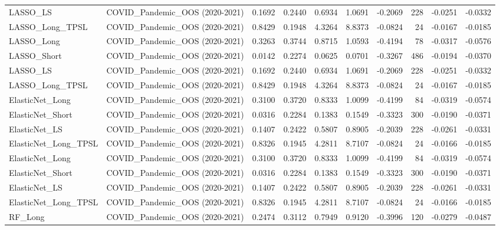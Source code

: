 \begin{tabular}{llrrrrrrrr}
\cline{1-10}
LASSO\_LS & COVID\_Pandemic\_OOS (2020-2021) & 0.1692 & 0.2440 & 0.6934 & 1.0691 & -0.2069 & 228 & -0.0251 & -0.0332 \\
\cline{1-10}
LASSO\_Long\_TPSL & COVID\_Pandemic\_OOS (2020-2021) & 0.8429 & 0.1948 & 4.3264 & 8.8373 & -0.0824 & 24 & -0.0167 & -0.0185 \\
\cline{1-10}
LASSO\_Long & COVID\_Pandemic\_OOS (2020-2021) & 0.3263 & 0.3744 & 0.8715 & 1.0593 & -0.4194 & 78 & -0.0317 & -0.0576 \\
\cline{1-10}
LASSO\_Short & COVID\_Pandemic\_OOS (2020-2021) & 0.0142 & 0.2274 & 0.0625 & 0.0701 & -0.3267 & 486 & -0.0194 & -0.0370 \\
\cline{1-10}
LASSO\_LS & COVID\_Pandemic\_OOS (2020-2021) & 0.1692 & 0.2440 & 0.6934 & 1.0691 & -0.2069 & 228 & -0.0251 & -0.0332 \\
\cline{1-10}
LASSO\_Long\_TPSL & COVID\_Pandemic\_OOS (2020-2021) & 0.8429 & 0.1948 & 4.3264 & 8.8373 & -0.0824 & 24 & -0.0167 & -0.0185 \\
\cline{1-10}
ElasticNet\_Long & COVID\_Pandemic\_OOS (2020-2021) & 0.3100 & 0.3720 & 0.8333 & 1.0099 & -0.4199 & 84 & -0.0319 & -0.0574 \\
\cline{1-10}
ElasticNet\_Short & COVID\_Pandemic\_OOS (2020-2021) & 0.0316 & 0.2284 & 0.1383 & 0.1549 & -0.3323 & 300 & -0.0190 & -0.0371 \\
\cline{1-10}
ElasticNet\_LS & COVID\_Pandemic\_OOS (2020-2021) & 0.1407 & 0.2422 & 0.5807 & 0.8905 & -0.2039 & 228 & -0.0261 & -0.0331 \\
\cline{1-10}
ElasticNet\_Long\_TPSL & COVID\_Pandemic\_OOS (2020-2021) & 0.8326 & 0.1945 & 4.2811 & 8.7107 & -0.0824 & 24 & -0.0166 & -0.0185 \\
\cline{1-10}
ElasticNet\_Long & COVID\_Pandemic\_OOS (2020-2021) & 0.3100 & 0.3720 & 0.8333 & 1.0099 & -0.4199 & 84 & -0.0319 & -0.0574 \\
\cline{1-10}
ElasticNet\_Short & COVID\_Pandemic\_OOS (2020-2021) & 0.0316 & 0.2284 & 0.1383 & 0.1549 & -0.3323 & 300 & -0.0190 & -0.0371 \\
\cline{1-10}
ElasticNet\_LS & COVID\_Pandemic\_OOS (2020-2021) & 0.1407 & 0.2422 & 0.5807 & 0.8905 & -0.2039 & 228 & -0.0261 & -0.0331 \\
\cline{1-10}
ElasticNet\_Long\_TPSL & COVID\_Pandemic\_OOS (2020-2021) & 0.8326 & 0.1945 & 4.2811 & 8.7107 & -0.0824 & 24 & -0.0166 & -0.0185 \\
\cline{1-10}
RF\_Long & COVID\_Pandemic\_OOS (2020-2021) & 0.2474 & 0.3112 & 0.7949 & 0.9120 & -0.3996 & 120 & -0.0279 & -0.0487 \\

\end{tabular}

